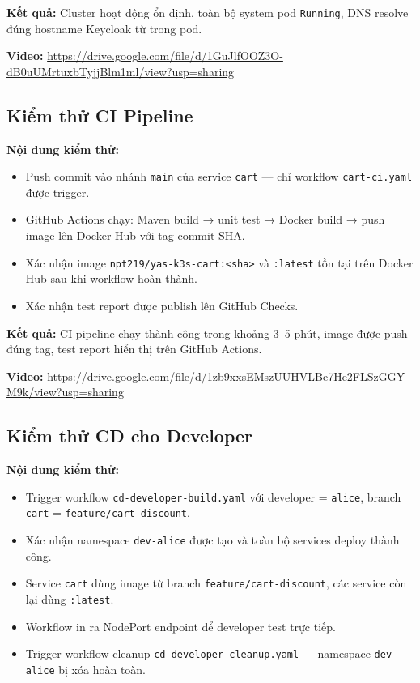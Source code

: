 \textbf{Kết quả:} Cluster hoạt động ổn định, toàn bộ system pod \texttt{Running}, DNS resolve đúng hostname Keycloak từ trong pod.

\noindent\textbf{Video:} \url{https://drive.google.com/file/d/1GuJlfOOZ3O-dB0uUMrtuxbTyjjBlm1ml/view?usp=sharing}

\subsection{Kiểm thử CI Pipeline}

\textbf{Nội dung kiểm thử:}
\begin{itemize}
    \item Push commit vào nhánh \texttt{main} của service \texttt{cart} — chỉ workflow \texttt{cart-ci.yaml} được trigger.
    \item GitHub Actions chạy: Maven build → unit test → Docker build → push image lên Docker Hub với tag commit SHA.
    \item Xác nhận image \texttt{npt219/yas-k3s-cart:<sha>} và \texttt{:latest} tồn tại trên Docker Hub sau khi workflow hoàn thành.
    \item Xác nhận test report được publish lên GitHub Checks.
\end{itemize}

\textbf{Kết quả:} CI pipeline chạy thành công trong khoảng 3--5 phút, image được push đúng tag, test report hiển thị trên GitHub Actions.

\noindent\textbf{Video:} \url{https://drive.google.com/file/d/1zb9xxsEMszUUHVLBe7He2FLSzGGY-M9k/view?usp=sharing}

\subsection{Kiểm thử CD cho Developer}

\textbf{Nội dung kiểm thử:}
\begin{itemize}
    \item Trigger workflow \texttt{cd-developer-build.yaml} với developer = \texttt{alice}, branch \texttt{cart} = \texttt{feature/cart-discount}.
    \item Xác nhận namespace \texttt{dev-alice} được tạo và toàn bộ services deploy thành công.
    \item Service \texttt{cart} dùng image từ branch \texttt{feature/cart-discount}, các service còn lại dùng \texttt{:latest}.
    \item Workflow in ra NodePort endpoint để developer test trực tiếp.
    \item Trigger workflow cleanup \texttt{cd-developer-cleanup.yaml} — namespace \texttt{dev-alice} bị xóa hoàn toàn.
\end{itemize}

